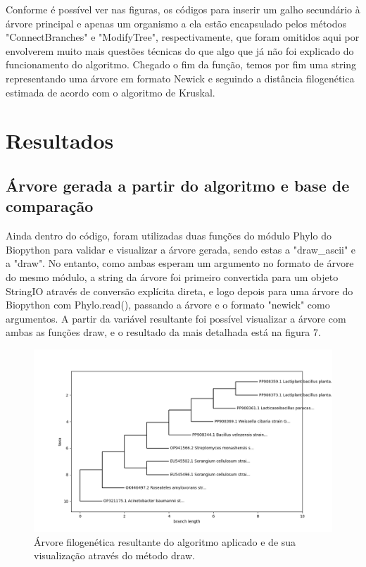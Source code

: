 \documentclass[brazilian,12pt,a4paper,final]{article}
\begin{document}
	 Conforme é possível ver nas figuras, os códigos para inserir um galho secundário à árvore principal e apenas um organismo a ela estão encapsulado pelos métodos "ConnectBranches" e "ModifyTree", respectivamente, que foram omitidos aqui por envolverem muito mais questões técnicas do que algo que já não foi explicado do funcionamento do algoritmo.
	 Chegado o fim da função, temos por fim uma string representando uma árvore em formato Newick e seguindo a distância filogenética estimada de acordo com o algoritmo de Kruskal.
	 
	 \section{Resultados}
	 \subsection{Árvore gerada a partir do algoritmo e base de comparação}
	 
	 Ainda dentro do código, foram utilizadas duas funções do módulo Phylo do Biopython para validar e visualizar a árvore gerada, sendo estas a "draw\_ascii" e a "draw". No entanto, como ambas esperam um argumento no formato de árvore do mesmo módulo, a string da árvore foi primeiro convertida para um objeto StringIO através de conversão explícita direta, e logo depois para uma árvore do Biopython com Phylo.read(), passando a árvore e o formato "newick" como argumentos. A partir da variável resultante foi possível visualizar a árvore com ambas as funções draw, e o resultado da mais detalhada está na figura 7.
	 
	  \begin{figure}[hbtp]
	 	\begin{center}
	 		\includegraphics[width=15cm]{filogenia.png}
	 		\caption{Árvore filogenética resultante do algoritmo aplicado e de sua visualização através do método draw.}
	 		\label{fig}
	 	\end{center}
	 \end{figure}
	 
\end{document}
